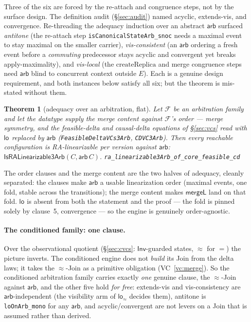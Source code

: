 \documentclass[11pt]{article}
\newtheorem{theorem}{Theorem}[section]
\newcommand{\mergeL}{\mathsf{mergeL}}
\newcommand{\loE}[1]{\mathsf{lo}^{#1}}
\newcommand{\lean}[1]{\texttt{#1}}
\newcommand{\M}[1]{\mathcal{#1}}
\newcommand{\eqobs}{\approx}
\newcommand{\Inv}{\mathsf{Inv}}
\newcommand{\arb}{\mathsf{arb}}
\begin{document}
Three of the six are forced by the re-attach and congruence steps, not by
the surface design. The
definition audit (\S\ref{sec:audit}) named acyclic, extends-vis, and
convergence. Re-threading the adequacy induction over an abstract $\arb$
surfaced \emph{antitone} (the re-attach step
\lean{isCanonicalStateArb\_snoc} needs a maximal event to stay maximal on
the smaller carrier), \emph{vis-consistent} (an $\arb$ ordering a fresh
event before a \emph{commuting} predecessor stays acyclic and convergent
yet breaks apply-maximality), and \emph{vis-local} (the
$\mathrm{createReplica}$ and merge congruence steps need $\arb$ blind to
concurrent context outside $E$). Each is a genuine design requirement, and
both instances below satisfy all six; but the theorem is mis-stated without
them.

\begin{theorem}[adequacy over an arbitration, flat]
\label{thm:arbadequacy}
Let $\M{F}$ be an arbitration family and let the datatype supply the
\emph{merge content} against $\M{F}$'s order --- merge symmetry, and the
feasible-delta and causal-delta equations of \S\ref{sec:vcs} read with
$\loE{}$ replaced by $\arb$ (\lean{FeasibleDeltaVCs3Arb}, \lean{CDVC3Arb}).
Then every reachable configuration is RA-linearizable per version against
$\arb$: $\mathsf{IsRALinearizable3Arb}(C, \arb\,C)$.
\hfill\lean{ra\_linearizable3Arb\_of\_core\_feasible\_cd}
\end{theorem}

The order clauses and the merge content are the two halves of adequacy,
cleanly separated: the clauses make $\arb$ a usable linearization order
(maximal events, one fold, stable across the transitions); the merge
content makes $\mergeL$ land on that fold. $\loE{}$ is absent from both the
statement and the proof --- the fold is pinned solely by clause~5,
convergence --- so the engine is genuinely order-agnostic.

\paragraph{The conditioned family: one clause.} Over the observational
quotient (\S\ref{sec:cvcs}: $\Inv$-guarded states, ${\eqobs}$ for $=$) the
picture inverts. The conditioned engine does not \emph{build} its Join from
the delta laws; it takes the $\eqobs$-Join as a primitive obligation
(VC~\ref{vc:merge}). So the conditioned arbitration family carries exactly
\emph{one} genuine clause, the $\eqobs$-Join against $\arb$, and the other
five hold \emph{for free}: extends-vis and vis-consistency are
$\arb$-independent (the visibility arm of $\mathsf{lo}_{\eqobs}$ decides
them), antitone is \lean{loOnArb\_mono} for any $\arb$, and
acyclic/convergent are not levers on a Join that is assumed rather than
derived.
\end{document}
